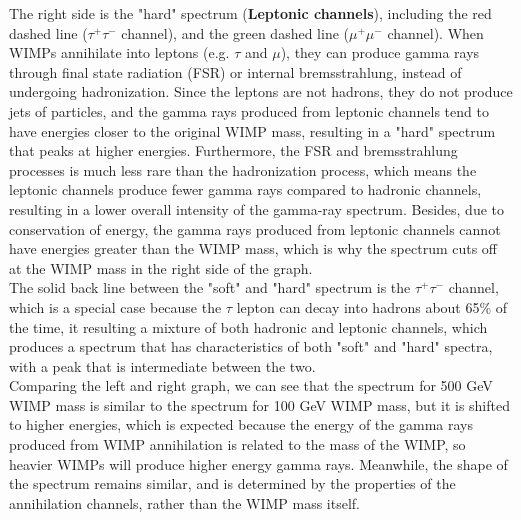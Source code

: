 \begin{extra}
    The right side is the "hard" spectrum (\textbf{Leptonic channels}), including the red dashed line ($\tau^+ \tau^-$ channel), and the green dashed line ($\mu^+ \mu^-$ channel). When WIMPs annihilate into leptons (e.g. $\tau$ and $\mu$), they can produce gamma rays through final state radiation (FSR) or internal bremsstrahlung, instead of undergoing hadronization. Since the leptons are not hadrons, they do not produce jets of particles, and the gamma rays produced from leptonic channels tend to have energies closer to the original WIMP mass, resulting in a "hard" spectrum that peaks at higher energies. Furthermore, the FSR and bremsstrahlung processes is much less rare than the hadronization process, which means the leptonic channels produce fewer gamma rays compared to hadronic channels, resulting in a lower overall intensity of the gamma-ray spectrum. Besides, due to conservation of energy, the gamma rays produced from leptonic channels cannot have energies greater than the WIMP mass, which is why the spectrum cuts off at the WIMP mass in the right side of the graph. \\

    The solid back line between the "soft" and "hard" spectrum is the $\tau^+ \tau^-$ channel, which is a special case because the $\tau$ lepton can decay into hadrons about 65\% of the time, it resulting a mixture of both hadronic and leptonic channels, which produces a spectrum that has characteristics of both "soft" and "hard" spectra, with a peak that is intermediate between the two. \\

    Comparing the left and right graph, we can see that the spectrum for 500 GeV WIMP mass is similar to the spectrum for 100 GeV WIMP mass, but it is shifted to higher energies, which is expected because the energy of the gamma rays produced from WIMP annihilation is related to the mass of the WIMP, so heavier WIMPs will produce higher energy gamma rays. Meanwhile, the shape of the spectrum remains similar, and is determined by the properties of the annihilation channels, rather than the WIMP mass itself.
\end{extra}




